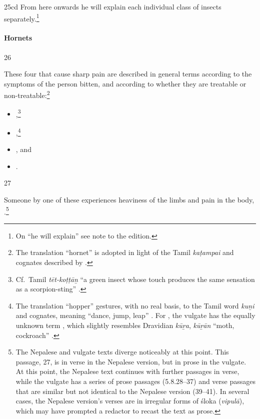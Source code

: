 \begin{translation}
\item[25cd] 
\label{ekajati}
From here onwards he will explain each individual class of insects
separately.\footnote{On  “he will explain” see note to
    the edition.}

\paragraph{Hornets}
\item[26]

These four  that cause sharp pain are described
in general terms according to the symptoms of the person bitten, and
according to whether they are treatable or non-treatable:\footnote{The
    translation “hornet” is adopted in light of the Tamil \emph{kaṭampai}
    and cognates described by \cite[\#1117]{DED}.}
\begin{itemize}
    \item {},\footnote{Cf.\ Tamil 
    \emph{t\={e}t-koṭṭā\b{n}} “a green insect whose touch produces the same 
    sensation as a scorpion-sting” \citep[\#2064]{DED}.} 
    \item {},\footnote{The translation “hopper” gestures,
    with no real basis, to the Tamil word \emph{kuṉi} and cognates,
    meaning “dance, jump, leap” \citep[\#1863]{DED}. For ,
    the vulgate has the equally unknown term , which slightly 
    resembles Dravidian \emph{kū\b{r}a}, \emph{kū\b{r}ān} “moth, cockroach” 
    \citep[\#1926]{DED}.}
     \item    {}, and \item {}.
\end{itemize}

\item[27]

Someone  by one of these experiences heaviness of the limbs 
and pain in the 
body, .\footnote{The 
Nepalese and vulgate texts diverge noticeably at this point.  This passage, 27, is in 
verse in the Nepalese version, but in prose in the vulgate.  At this 
point, the Nepalese text continues with further passages in verse, while 
the vulgate has a series of prose passages (5.8.28--37) and verse passages that are 
similar but not identical to the Nepalese version (39--41).  In several cases, 
the Nepalese version's verses are in irregular forms of śloka (\emph{vipulā}), 
which may have prompted a redactor to recast the text as prose.}


\end{translation}
